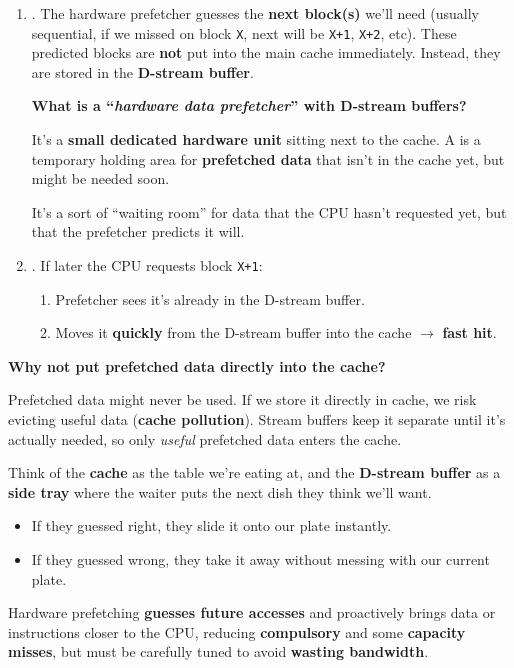 \begin{itemize}
\begin{enumerate}
        
        \item {}. The hardware prefetcher guesses the \textbf{next block(s)} we'll need (usually sequential, if we missed on block \texttt{X}, next will be \texttt{X+1}, \texttt{X+2}, etc). These predicted blocks are \textbf{not} put into the main cache immediately. Instead, they are stored in the \textbf{D-stream buffer}.

        \begin{flushleft}
            \textcolor{Green3}{ \textbf{What is a ``\emph{hardware data prefetcher}'' with D-stream buffers?}}
        \end{flushleft}
        It's a \textbf{small dedicated hardware unit} sitting next to the cache. A  is a temporary holding area for \textbf{prefetched data} that isn't in the cache yet, but might be needed soon.

        It's a sort of ``waiting room'' for data that the CPU hasn't requested yet, but that the prefetcher predicts it will.


        \item {}. If later the CPU requests block \texttt{X+1}:
        \begin{enumerate}
            \item Prefetcher sees it's already in the D-stream buffer.
            \item Moves it \textbf{quickly} from the D-stream buffer into the cache $\rightarrow$ \textbf{fast hit}.
        \end{enumerate}
    \end{enumerate}
    \newpage
    \begin{flushleft}
        \textcolor{Green3}{ \textbf{Why not put prefetched data directly into the cache?}}
    \end{flushleft}
    Prefetched data might never be used. If we store it directly in cache, we risk evicting useful data (\textbf{cache pollution}). Stream buffers keep it separate until it's actually needed, so only \emph{useful} prefetched data enters the cache.

    \begin{examplebox}
        Think of the \textbf{cache} as the table we're eating at, and the \textbf{D-stream buffer} as a \textbf{side tray} where the waiter puts the next dish they think we'll want.
        \begin{itemize}
            \item If they guessed right, they slide it onto our plate instantly.
            \item If they guessed wrong, they take it away without messing with our current plate.
        \end{itemize}
    \end{examplebox}
\end{itemize}
Hardware prefetching \textbf{guesses future accesses} and proactively brings data or instructions closer to the CPU, reducing \textbf{compulsory} and some \textbf{capacity misses}, but must be carefully tuned to avoid \textbf{wasting bandwidth}.
